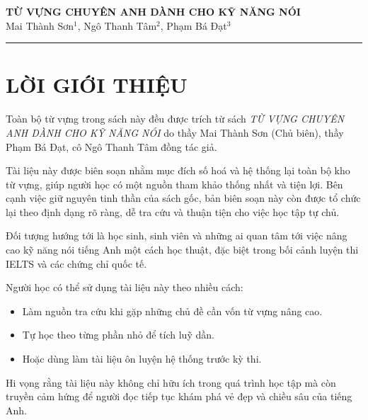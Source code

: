 \begin{center}
    
    \large \textbf{TỪ VỰNG CHUYÊN ANH DÀNH CHO KỸ NĂNG NÓI}\\
    \vspace{2mm}
    Mai Thành Sơn$^{1}$, Ngô Thanh Tâm$^{2}$, Phạm Bá Đạt$^{3}$\\

        \begin{center}
		    \textcolor{azul}{\rule{170mm}{0.5mm}}
	    \end{center}	
\end{center}

\section*{LỜI GIỚI THIỆU}
\thispagestyle{empty}
\noindent
Toàn bộ từ vựng trong sách này đều được trích từ sách \emph{TỪ VỰNG CHUYÊN ANH DÀNH CHO KỸ NĂNG NÓI} do thầy Mai Thành Sơn (Chủ biên), thầy Phạm Bá Đạt, cô Ngô Thanh Tâm đồng tác giả.

\vspace{3mm}
\noindent
Tài liệu này được biên soạn nhằm mục đích số hoá và hệ thống lại toàn bộ kho từ vựng,
giúp người học có một nguồn tham khảo thống nhất và tiện lợi. 
Bên cạnh việc giữ nguyên tinh thần của sách gốc, bản biên soạn này còn được 
tổ chức lại theo định dạng rõ ràng, dễ tra cứu và thuận tiện cho việc học tập tự chủ.


\vspace{3mm}
\noindent
Đối tượng hướng tới là học sinh, sinh viên và những ai quan tâm tới việc 
nâng cao kỹ năng nói tiếng Anh một cách học thuật, đặc biệt trong bối cảnh 
luyện thi IELTS và các chứng chỉ quốc tế. 


\vspace{3mm}
\noindent
Người học có thể sử dụng tài liệu này theo nhiều cách: 

\begin{itemize}
    \item Làm nguồn tra cứu khi gặp những chủ đề cần vốn từ vựng nâng cao.
    \item Tự học theo từng phần nhỏ để tích luỹ dần.
    \item Hoặc dùng làm tài liệu ôn luyện hệ thống trước kỳ thi.
\end{itemize}

 

\vspace{3mm}
\noindent
Hi vọng rằng tài liệu này không chỉ hữu ích trong quá trình 
học tập mà còn truyền cảm hứng để người đọc tiếp tục khám phá vẻ đẹp 
và chiều sâu của tiếng Anh.

